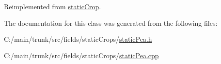 Reimplemented from \hyperlink{classstatic_crop_af19d8a1e4f4833325f6712c22ede8b45}{staticCrop}.

The documentation for this class was generated from the following files:\begin{DoxyCompactItemize}
\item 
C:/main/trunk/src/fields/staticCrops/\hyperlink{static_pea_8h}{staticPea.h}\item 
C:/main/trunk/src/fields/staticCrops/\hyperlink{static_pea_8cpp}{staticPea.cpp}\end{DoxyCompactItemize}
